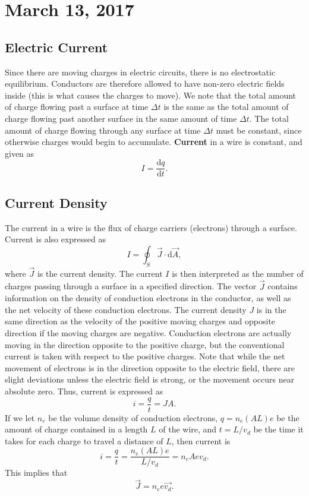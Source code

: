 \documentclass[11pt]{article}
\theoremstyle{plain} %
\theoremstyle{definition}
\theoremstyle{example}
\theoremstyle{remark}
\begin{document}
\section{March 13, 2017}
\subsection{Electric Current}

Since there are moving charges in electric circuits, there is no electrostatic equilibrium. Conductors are therefore allowed to have non-zero electric fields inside (this is what causes the charges to move). We note that the total amount of charge flowing past a surface at time $\Delta t$ is the same as the total amount of charge flowing past another surface in the same amount of time $\Delta t$. The total amount of charge flowing through any surface at time $\Delta t$ must be constant, since otherwise charges would begin to accumulate. \textbf{Current} in a wire is constant, and given as 
$$I = \frac{\mathrm d q}{\mathrm d t}.$$

\subsection{Current Density}
The current in a wire is the flux of charge carriers (electrons) through a surface. Current is also expressed as 
$$I = \oint_S\vec{J} \cdot \mathrm d \vec{A},$$
where $\vec{J}$ is the current density. The current $I$ is then interpreted as the number of charges passing through a surface in a specified direction. The vector $\vec{J}$ contains information on the density of conduction electrons in the conductor, as well as the net velocity of these conduction electrons. The current density $J$ is in the same direction as the velocity of the positive moving charges and opposite direction if the moving charges are negative. Conduction electrons are actually moving in the direction opposite to the positive charge, but the conventional current is taken with respect to the positive charges. Note that while the net movement of electrons is in the direction opposite to the electric field, there are slight deviations unless the electric field is strong, or the movement occurs near absolute zero. Thus, current is expressed as 
$$i = \frac{q}{t} = JA.$$
If we let $n_e$ be the volume density of conduction electrons, $q=n_e(AL)e$ be the amount of charge contained in a length $L$ of the wire, and $t=L/v_d$ be the time it takes for each charge to travel a distance of $L$, then current is 
$$i = \frac{q}{t} = \frac{n_e(AL)e}{L/v_d} = n_eAev_d.$$
This implies that 
$$\vec{J} = n_ee\vec{v_d}.$$
\end{document}
